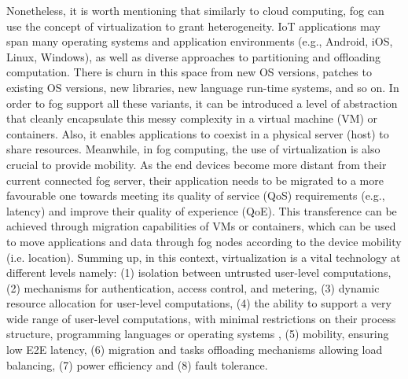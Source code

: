 \noindent\tab Nonetheless, it is worth mentioning that similarly to cloud computing, fog can use the concept of virtualization to grant heterogeneity. IoT applications may span many operating systems and application environments (e.g., Android, iOS, Linux, Windows), as well as diverse approaches to partitioning and offloading computation. There is churn in this space from new OS versions, patches to existing OS versions, new libraries, new language run-time systems, and so on. In order to fog support all these variants, it can be introduced a level of abstraction that cleanly encapsulate this messy complexity in a virtual machine (VM) or containers. Also, it enables applications to coexist in a physical server (host) to share resources. Meanwhile, in fog computing, the use of virtualization is also crucial to provide mobility. As the end devices become more distant from their current connected fog server, their application needs to be migrated to a more favourable one towards meeting its quality of service (QoS) requirements (e.g., latency) and improve their quality of experience (QoE). This transference can be achieved through migration capabilities of VMs or containers, which can be used to move applications and data through fog nodes according to the device mobility (i.e. location). Summing up, in this context, virtualization is a vital technology at different levels namely: (1) isolation between untrusted user-level computations, (2) mechanisms for authentication, access control, and metering, (3) dynamic resource allocation for user-level computations, (4) the ability to support a very wide range of user-level computations, with minimal restrictions on their process structure, programming languages or operating systems \cite{Cloudlet83:online}, (5) mobility, ensuring low E2E latency, (6) migration and tasks offloading mechanisms allowing load balancing, (7) power efficiency and (8) fault tolerance.\\
